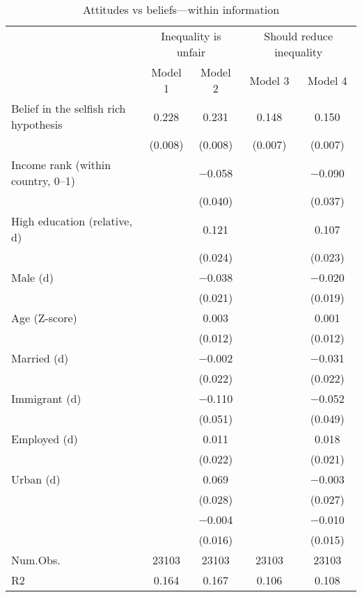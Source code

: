 \begin{table}

\caption{\label{tab:unnamed-chunk-66}Attitudes vs beliefs---within information}
\centering
\begin{tabular}[t]{lcccc}
\toprule
\multicolumn{1}{c}{ } & \multicolumn{2}{c}{Inequality is unfair} & \multicolumn{2}{c}{Should reduce inequality} \\
\cmidrule(l{3pt}r{3pt}){2-3} \cmidrule(l{3pt}r{3pt}){4-5}
  & Model 1 & Model 2 & Model 3 & Model 4\\
\midrule
Belief in the selfish rich hypothesis & \num{0.228} & \num{0.231} & \num{0.148} & \num{0.150}\\
 & (\num{0.008}) & (\num{0.008}) & (\num{0.007}) & (\num{0.007})\\
Income rank (within country, 0--1) &  & \num{-0.058} &  & \num{-0.090}\\
 &  & (\num{0.040}) &  & (\num{0.037})\\
High education (relative, d) &  & \num{0.121} &  & \num{0.107}\\
 &  & (\num{0.024}) &  & (\num{0.023})\\
Male (d) &  & \num{-0.038} &  & \num{-0.020}\\
 &  & (\num{0.021}) &  & (\num{0.019})\\
Age (Z-score) &  & \num{0.003} &  & \num{0.001}\\
 &  & (\num{0.012}) &  & (\num{0.012})\\
Married (d) &  & \num{-0.002} &  & \num{-0.031}\\
 &  & (\num{0.022}) &  & (\num{0.022})\\
Immigrant (d) &  & \num{-0.110} &  & \num{-0.052}\\
 &  & (\num{0.051}) &  & (\num{0.049})\\
Employed (d) &  & \num{0.011} &  & \num{0.018}\\
 &  & (\num{0.022}) &  & (\num{0.021})\\
Urban (d) &  & \num{0.069} &  & \num{-0.003}\\
 &  & (\num{0.028}) &  & (\num{0.027})\\
 &  & \num{-0.004} &  & \num{-0.010}\\
 &  & (\num{0.016}) &  & (\num{0.015})\\
\midrule
Num.Obs. & \num{23103} & \num{23103} & \num{23103} & \num{23103}\\
R2 & \num{0.164} & \num{0.167} & \num{0.106} & \num{0.108}\\
\bottomrule
\end{tabular}
\end{table}
